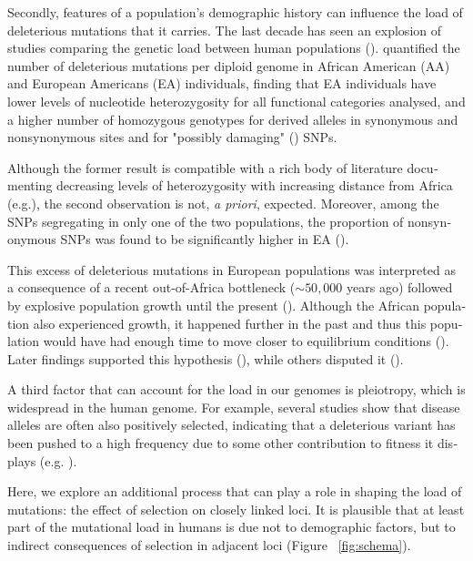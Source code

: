 \begin{refsection}
\begin{otherlanguage}{english}
Secondly, features of a population's demographic history can influence the load of deleterious mutations that it carries. The last decade has seen an explosion of studies comparing the genetic load between human populations (\cite{Tishkoff2002,Lohmueller2008,Lohmueller2014,Simons2014,Henn2015a,Henn2016}). \textcite{Lohmueller2008} quantified the number of deleterious mutations per diploid genome in African American (AA) and European Americans (EA) individuals, finding that EA individuals have lower levels of nucleotide heterozygosity for all functional categories analysed, and a higher number of homozygous genotypes for derived alleles in synonymous and nonsynonymous sites and for "possibly damaging" (\cite{Adzhubei2010}) SNPs.

Although the former result is compatible with a rich body of literature documenting decreasing levels of heterozygosity with increasing distance from Africa (e.g.\cite{Tishkoff2002,Henn2015a}), the second observation is not, \emph{a priori}, expected. Moreover, among the SNPs segregating in only one of the two populations, the proportion of nonsynonymous SNPs was found to be significantly higher in EA (\cite{Lohmueller2008}).

This excess of deleterious mutations in European populations was interpreted as a consequence of a recent out-of-Africa bottleneck ($\sim 50,000$ years ago) followed by explosive population growth until the present (\cite{Lohmueller2008}). Although the African population also experienced  growth, it happened further in the past and thus this population would have had enough time to move closer to equilibrium conditions (\cite{Lohmueller2008}). Later findings supported this hypothesis (\cite{Alkan2009,Subramanian2012,Subramanian2016,Hodgkinson2013,Peischl2013,Peischl2015}), while others disputed it (\cite{Do2015,Simons2014}). 

A third factor that can account for the load in our genomes is pleiotropy, which is widespread in the human genome. For example, several studies show that disease alleles are often also positively selected, indicating that a deleterious variant has been pushed to a high frequency due to some other contribution to fitness it displays (e.g. \cite{Corona2010}). %

Here, we explore an additional process that can play a role in shaping the load of mutations: the effect of selection on closely linked loci. It is plausible that at least part of the mutational load in humans is due not to demographic factors, but to indirect consequences of selection in adjacent loci (Figure ~\ref{fig:schema}).


\end{otherlanguage}
\end{refsection}
